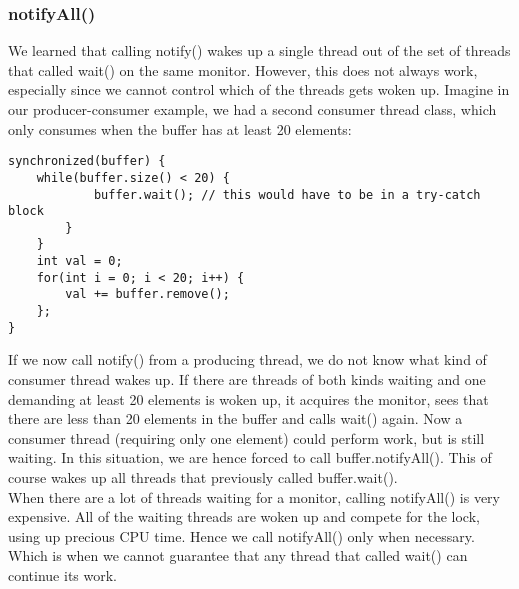 \documentclass[main.tex]{subfiles}
\begin{document}
\subsubsection{notifyAll()}
We learned that calling notify() wakes up a single thread out of the set of threads that called wait() on the same monitor. However, this does not always work, especially since we cannot control which of the threads gets woken up. Imagine in our producer-consumer example, we had a second consumer thread class, which only consumes when the buffer has at least 20 elements:
\begin{verbatim}
synchronized(buffer) {
    while(buffer.size() < 20) {
            buffer.wait(); // this would have to be in a try-catch block
        }
    }
    int val = 0;
    for(int i = 0; i < 20; i++) {
        val += buffer.remove();
    };
}
\end{verbatim}
If we now call notify() from a producing thread, we do not know what kind of consumer thread wakes up. If there are threads of both kinds waiting and one demanding at least 20 elements is woken up, it acquires the monitor, sees that there are less than 20 elements in the buffer and calls wait() again. Now a consumer thread (requiring only one element) could perform work, but is still waiting. In this situation, we are hence forced to call buffer.notifyAll(). This of course wakes up all threads that previously called buffer.wait().\\
When there are a lot of threads waiting for a monitor, calling notifyAll() is very expensive. All of the waiting threads are woken up and compete for the lock, using up precious CPU time. Hence we call notifyAll() only when necessary. Which is when we cannot guarantee that any thread that called wait() can continue its work.
\end{document}
